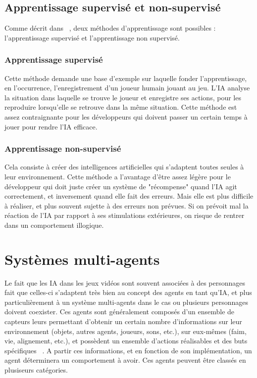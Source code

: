 \documentclass[asi]{picINSAIA}
\begin{document}
\section{Apprentissage supervisé et non-supervisé}
Comme décrit dans ~\cite{tambellinicomment}, deux méthodes d’apprentissage sont possibles : l’apprentissage supervisé et l’apprentissage non supervisé.
\subsection{Apprentissage supervisé}
Cette méthode demande une base d’exemple sur laquelle fonder l’apprentissage, en l’occurrence, l’enregistrement d’un joueur humain jouant au jeu. L’IA analyse la situation dans laquelle se trouve le joueur et enregistre ses actions, pour les reproduire lorsqu’elle se retrouve dans la même situation. Cette méthode est assez contraignante pour les développeurs qui doivent passer un certain temps à jouer pour rendre l’IA efficace.
\subsection{Apprentissage non-supervisé}
Cela consiste à créer des intelligences artificielles qui s’adaptent toutes seules à leur environnement. Cette méthode a l’avantage d’être assez légère pour le développeur qui doit juste créer un système de "récompense" quand l’IA agit correctement, et inversement quand elle fait des erreurs. Mais elle est plus difficile à réaliser, et plus souvent sujette à des erreurs non prévues. Si on prévoit mal la réaction de l’IA par rapport à ses stimulations extérieures, on risque de rentrer dans un comportement illogique.


\chapter{Systèmes multi-agents}
Le fait que les IA dans les jeux vidéos sont souvent associées à des personnages fait que celles-ci s'adaptent très bien au concept des agents en tant qu'IA, et plus particulièrement à un système multi-agents dans le cas ou plusieurs personnages doivent coexister.
Ces agents sont généralement composés d'un ensemble de capteurs leurs permettant d'obtenir un certain nombre d'informations sur leur environnement (objets, autres agents, joueurs, sons, etc.), sur eux-mêmes (faim, vie, alignement, etc.), et possèdent un ensemble d'actions réalisables et des buts spécifiques ~\cite{IntelAgents4CompGames}. A partir ces informations, et en fonction de son implémentation, un agent déterminera un comportement à avoir.
Ces agents peuvent être classés en plusiseurs catégories.
\end{document}

